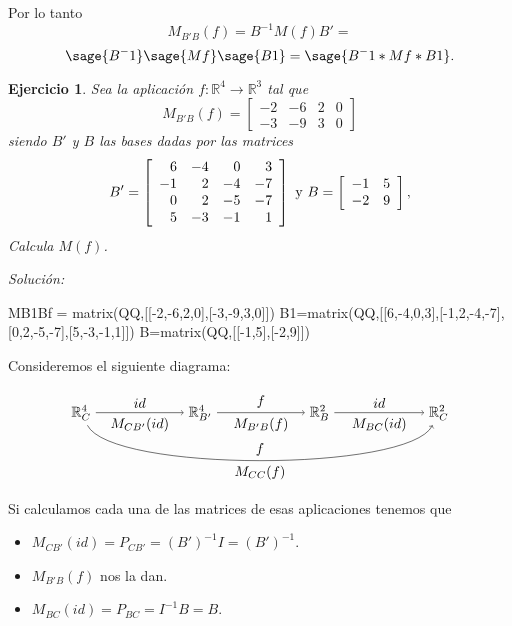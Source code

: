 \documentclass{amsart}
\newtheorem{ejer}{Ejercicio}
\def\r{\mathbb{R}}
\begin{document}
Por lo tanto
\[ M_{B'B}(f) = B^{-1}M(f)B' = \] \[ \sage{B^-1}\sage{Mf}\sage{B1} = 
\sage{B^-1*Mf*B1}. \]


\begin{ejer} 
Sea la aplicación $f: \r ^4\to \r ^3$ tal que 
\[ M_{B'B}(f) = \left[ \begin{array}{rrrr} -2 & -6 & 2 & 0 \\ -3 & -9 & 3 & 0 \end{array} \right] \] siendo $B'$ y $B$ las bases dadas por las matrices 
\[ B' = \left[ \begin{array}{rrrr} 6 & -4 & 0 & 3\\ -1 & 2 & -4 & -7\\ 
0 & 2 & -5 & -7\\ 5 & -3 & -1 & 1 \end{array} \right] \ \hbox{y} \ B = \left[ \begin{array}{rr} -1 & 5\\ -2 & 9 \end{array} \right],  \] 
Calcula $M(f)$.
\end{ejer}

{\it Soluci\'on:}
\begin{sageblock}
MB1Bf = matrix(QQ,[[-2,-6,2,0],[-3,-9,3,0]])
B1=matrix(QQ,[[6,-4,0,3],[-1,2,-4,-7],[0,2,-5,-7],[5,-3,-1,1]])
B=matrix(QQ,[[-1,5],[-2,9]])
\end{sageblock}

Consideremos el siguiente diagrama:

$$
\begin{tikzpicture}[xscale = 1.5]
\node (RCa) at (0,0) {$\r^4_C$};
\node (RBp) at (2,0) {$\r^4_{B'}$};
\node (RB)  at (4,0) {$\r^2_B$};
\node (RCb) at (6,0) {$\r^2_C$};
\draw[->] (RCa) to node [above] {$id$} 
                   node [below] {$M_{CB'}(id)$} (RBp);
\draw[->] (RBp) to node [above] {$f$} 
                   node [below] {$M_{B'B}(f)$} (RB); 
\draw[->] (RB)  to node [above] {$id$} 
                   node [below] {$M_{BC}(id)$} (RCb);
\draw[->] (RCa) .. controls (0.5,-1.5) and (5.5,-1.5) .. 
                node [below] {$M_{CC}(f)$} 
                node [above] {$f$} (RCb);
\end{tikzpicture}
$$

Si calculamos cada una de las matrices de esas aplicaciones tenemos que
\begin{itemize}
\item $M_{CB'}(id) = P_{CB'} = (B')^{-1}I = (B')^{-1}$.
\item $M_{B'B}(f)$ nos la dan.
\item $M_{BC}(id) = P_{BC} = I^{-1}B= B$. 
\end{itemize}
\end{document}
